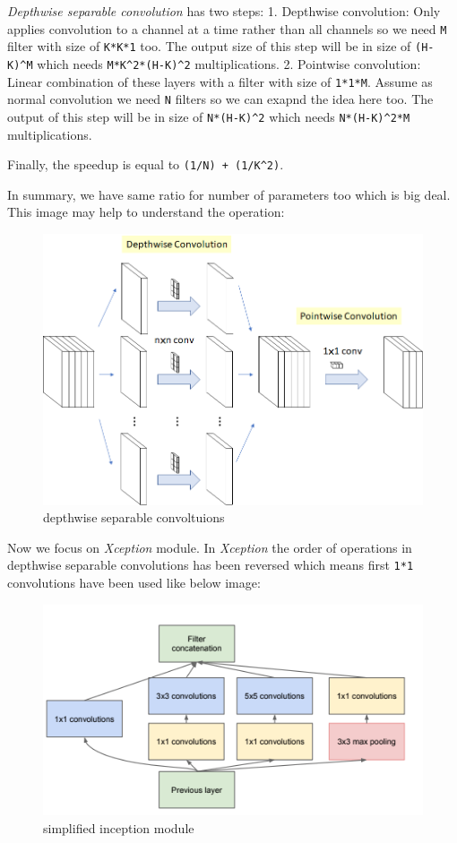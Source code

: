 \documentclass[11pt]{article}
\makeatletter
\def\maxwidth{\ifdim\Gin@nat@width>\linewidth\linewidth
    \else\Gin@nat@width\fi}
\let\Oldincludegraphics\includegraphics
\renewcommand{\includegraphics}[1]{\Oldincludegraphics[width=.8\maxwidth]{#1}}
\makeatother
\begin{document}
\emph{Depthwise separable convolution} has two steps: 1. Depthwise
convolution: Only applies convolution to a channel at a time rather than
all channels so we need \texttt{M} filter with size of \texttt{K*K*1}
too. The output size of this step will be in size of \texttt{(H-K)\^{}M}
which needs \texttt{M*K\^{}2*(H-K)\^{}2} multiplications. 2. Pointwise
convolution: Linear combination of these layers with a filter with size
of \texttt{1*1*M}. Assume as normal convolution we need \texttt{N}
filters so we can exapnd the idea here too. The output of this step will
be in size of \texttt{N*(H-K)\^{}2} which needs \texttt{N*(H-K)\^{}2*M}
multiplications.

Finally, the speedup is equal to \texttt{(1/N)\ +\ (1/K\^{}2)}.

In summary, we have same ratio for number of parameters too which is big
deal. This image may help to understand the operation:

\begin{figure}
\centering
\includegraphics{wiki/3_1.png}
\caption{depthwise separable convoltuions}
\end{figure}

Now we focus on \emph{Xception} module. In \emph{Xception} the order of
operations in depthwise separable convolutions has been reversed which
means first \texttt{1*1} convolutions have been used like below image:

\begin{figure}
\centering
\includegraphics{wiki/3_3.png}
\caption{simplified inception module}
\end{figure}
\end{document}
